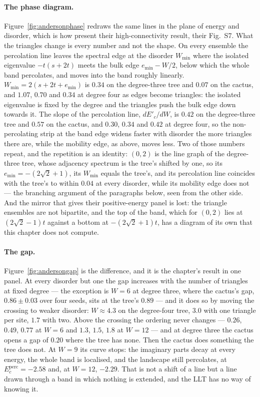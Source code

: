 \paragraph{The phase diagram.} Figure~\ref{fig:andersonphase} redraws
the same lines in the plane of energy and disorder, which is how
\citeauthor{tonetti2026} present their high-connectivity result, their
Fig.~S7. What the triangles change is every number and not the shape. On
every ensemble the percolation line leaves the spectral edge at the
disorder $W_{\min}$ where the isolated eigenvalue $-t(s+2t)$ meets the
bulk edge $e_{\min}-W/2$, below which the whole band percolates, and
moves into the band roughly linearly. $W_{\min}=2(s+2t+e_{\min})$ is
$0.34$ on the degree-three tree and $0.07$ on the cactus, and $1.07$,
$0.70$ and $0.34$ at degree four as edges become triangles: the isolated
eigenvalue is fixed by the degree and the triangles push the bulk edge
down towards it. The slope of the percolation line, $dE'_{c}/dW$, is
$0.42$ on the degree-three tree and $0.57$ on the cactus, and $0.30$,
$0.34$ and $0.42$ at degree four, so the non-percolating strip at the
band edge widens faster with disorder the more triangles there are,
while the mobility edge, as above, moves less. Two of those numbers
repeat, and the repetition is an identity: $(0,2)$ is the line graph of
the degree-three tree, whose adjacency spectrum is the tree's shifted by
one, so its $e_{\min}=-(2\sqrt2+1)$, its $W_{\min}$ equals the tree's,
and its percolation line coincides with the tree's to within $0.04$ at
every disorder, while its mobility edge does not --- the branching
argument of the paragraphs below, seen from the other side. And the
mirror that gives \citeauthor{tonetti2026} their positive-energy panel
is lost: the triangle ensembles are not bipartite, and the top of the
band, which for $(0,2)$ lies at $(2\sqrt2-1)t$ against a bottom at
$-(2\sqrt2+1)t$, has a diagram of its own that this chapter does not
compute.

\paragraph{The gap.} Figure~\ref{fig:andersongap} is the difference, and
it is the chapter's result in one panel. At every disorder but one the gap increases with the number of
triangles at fixed degree --- the exception is $W=6$ at degree three, where the cactus's gap, $0.86\pm0.03$ over four seeds, sits at the tree's $0.89$ ---
and it does so by moving the crossing to weaker disorder: $W\approx4.3$ on the degree-four
tree, $3.0$ with one triangle per site, $1.7$ with two. Above the crossing
the ordering never changes --- $0.26$, $0.49$, $0.77$ at $W=6$ and $1.3$, $1.5$, $1.8$ at $W=12$ --- and at degree three the cactus opens a gap of
$0.20$ where the tree has none. Then the cactus does something the tree
does not. At $W=9$ its curve stops: the imaginary parts decay at every
energy, the whole band is localised, and the landscape still percolates,
at $E_{c}^{\mathrm{perc}}=-2.58$ and, at $W=12$, $-2.29$. That is not a shift
of a line but a line drawn through a band in which nothing is extended,
and the LLT has no way of knowing it.

